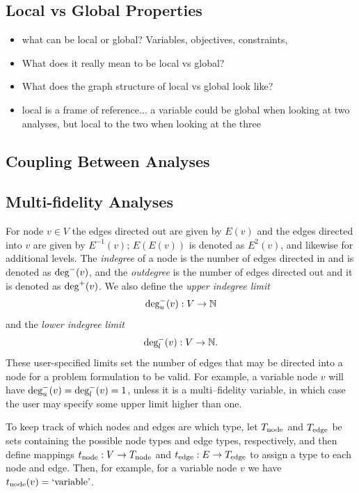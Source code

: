\subsection{Local vs Global Properties}

\begin{itemize}
  \item what can be local or global? Variables, objectives, constraints, 
  \item What does it really mean to be local vs global? 
  \item What does the graph structure of local vs global look like? 
  \item local is a frame of reference... a variable could be global when looking at two analyses, but local to the two when looking at the three
\end{itemize}

\subsection{Coupling Between Analyses}

\subsection{Multi-fidelity Analyses}

For node $v \in V$ the edges directed out are given by $E(v)$ and the edges directed into $v$ are given by $E^{-1}(v)$; $E(E(v))$ is denoted as $E^2(v)$, and likewise for additional levels. 
The \emph{indegree} of a node is the number of edges directed in and is denoted as $\textrm{deg}^-(v)$, and the \emph{outdegree} is the number of edges directed out and it is denoted as $\textrm{deg}^+(v)$.
We also define the \emph{upper indegree limit} 
\begin{equation}
\textrm{deg}_u^-(v):V \to \mathbb{N}
\end{equation} 
and the \emph{lower indegree limit}
\begin{equation}
\textrm{deg}_l^-(v):V \to \mathbb{N}.
\end{equation}
These user-specified limits set the number of edges that may be directed into a node for a problem formulation to be valid. For example, a variable node $v$ will have $\textrm{deg}_u^-(v) = \textrm{deg}_l^-(v) = 1$, unless it is a multi--fidelity variable, in which case the user may specify some upper limit higher than one.

To keep track of which nodes and edges are which type, let $T_\textrm{node}$ and $T_\textrm{edge}$ be sets containing the possible node types and edge types, respectively, and then define mappings $t_\textrm{node}:V \to T_\textrm{node}$ and $t_\textrm{edge}:E \to T_\textrm{edge}$ to assign a type to each node and edge.
Then, for example, for a variable node $v$ we have $t_\textrm{node}(v) = \textrm{`variable'}$.

